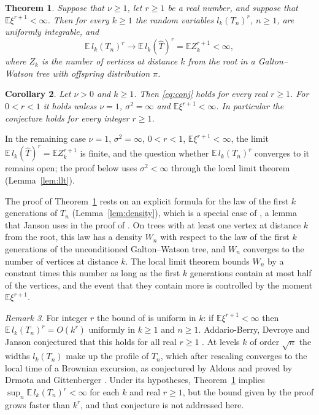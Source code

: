 \documentclass[11pt]{amsart}
\newtheorem{theorem}{Theorem}[section]
\newtheorem{corollary}[theorem]{Corollary}
\theoremstyle{remark}
\newtheorem{remark}[theorem]{Remark}
\numberwithin{equation}{section}
\newcommand{\E}{\mathbb E}
\newcommand{\hT}{\widehat T}
\begin{document}
\begin{theorem}\label{thm:main}
Suppose that $\nu\ge1$, let $r\ge1$ be a real number, and suppose that $\E\xi^{r+1}<\infty$. Then for every $k\ge1$ the random variables $l_k(T_n)^r$, $n\ge1$, are uniformly integrable, and
\begin{equation}\label{eq:limit}
\E\, l_k(T_n)^r\to\E\, l_k(\hT)^r=\E Z_k^{r+1}<\infty,
\end{equation}
where $Z_k$ is the number of vertices at distance $k$ from the root in a Galton--Watson tree with offspring distribution $\pi$.
\end{theorem}

\begin{corollary}\label{cor:conj}
Let $\nu>0$ and $k\ge1$. Then \eqref{eq:conj} holds for every real $r\ge1$. For $0<r<1$ it holds unless $\nu=1$, $\sigma^2=\infty$ and $\E\xi^{r+1}<\infty$. In particular the conjecture holds for every integer $r\ge1$.
\end{corollary}

In the remaining case $\nu=1$, $\sigma^2=\infty$, $0<r<1$, $\E\xi^{r+1}<\infty$, the limit $\E\, l_k(\hT)^r=\E Z_k^{r+1}$ is finite, and the question whether $\E\, l_k(T_n)^r$ converges to it remains open; the proof below uses $\sigma^2<\infty$ through the local limit theorem (Lemma~\ref{lem:llt}).

The proof of Theorem~\ref{thm:main} rests on an explicit formula for the law of the first $k$ generations of $T_n$ (Lemma~\ref{lem:density}), which is a special case of \cite[Lemma~15.9]{J12}, a lemma that Janson uses in the proof of \cite[Theorem~7.1]{J12}. On trees with at least one vertex at distance $k$ from the root, this law has a density $W_n$ with respect to the law of the first $k$ generations of the unconditioned Galton--Watson tree, and $W_n$ converges to the number of vertices at distance $k$. The local limit theorem bounds $W_n$ by a constant times this number as long as the first $k$ generations contain at most half of the vertices, and the event that they contain more is controlled by the moment $\E\xi^{r+1}$.

\begin{remark}\label{rem:adj}
For integer $r$ the bound of \cite[Theorem~1.13]{J06} is uniform in $k$: if $\E\xi^{r+1}<\infty$ then $\E\, l_k(T_n)^r=O(k^r)$ uniformly in $k\ge1$ and $n\ge1$. Addario-Berry, Devroye and Janson conjectured that this holds for all real $r\ge1$ \cite[Section~1]{ADJ13}. At levels $k$ of order $\sqrt n$ the widths $l_k(T_n)$ make up the profile of $T_n$, which after rescaling converges to the local time of a Brownian excursion, as conjectured by Aldous \cite{Ald91} and proved by Drmota and Gittenberger \cite{DG97}. Under its hypotheses, Theorem~\ref{thm:main} implies $\sup_n\E\, l_k(T_n)^r<\infty$ for each $k$ and real $r\ge1$, but the bound given by the proof grows faster than $k^r$, and that conjecture is not addressed here.
\end{remark}
\end{document}
